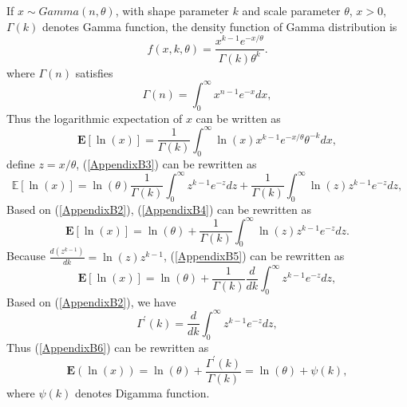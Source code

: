 \documentclass[12pt, draftclsnofoot, onecolumn]{IEEEtran}
\begin{document}
\section{}\label{proof log expectation gamma}
If $x\sim Gamma(n, \theta)$, with shape parameter $k$ and scale parameter $\theta$, $x>0$, $\Gamma(k)$ denotes Gamma function, the density function of Gamma distribution is
\begin{equation}
f(x,k,\theta)=\frac{x^{k-1}e^{-x/\theta}}{\Gamma(k)\theta^{k}}.
\label{AppendixB1}
\end{equation}
where $\Gamma(n)$ satisfies\cite{papoulis2002probability}
\begin{equation}
\Gamma(n)=\int_{0}^{\infty}x^{n-1}e^{-x}dx,
\label{AppendixB2}
\end{equation}
Thus the logarithmic expectation of $x$ can be written as
\begin{equation}
\mathbf{E}[\ln(x)]=\frac{1}{\Gamma(k)}\int_{0}^{\infty}\ln(x)x^{k-1}e^{-x/\theta}\theta^{-k}dx,
\label{AppendixB3}
\end{equation}
define $z=x/\theta$, (\ref{AppendixB3}) can be rewritten as
\begin{equation}
\mathbb{E}[\ln(x)]=\ln(\theta)\frac{1}{\Gamma(k)}\int_{0}^{\infty}z^{k-1}e^{-z}dz+\frac{1}{\Gamma(k)}\int_{0}^{\infty}\ln(z)z^{k-1}e^{-z}dz,
\label{AppendixB4}
\end{equation}
Based on (\ref{AppendixB2}), (\ref{AppendixB4}) can be rewritten as
\begin{equation}
\mathbf{E}[\ln(x)]=\ln(\theta)+\frac{1}{\Gamma(k)}\int_{0}^{\infty}\ln(z)z^{k-1}e^{-z}dz.
\label{AppendixB5}
\end{equation}
Because $\frac{d(z^{k-1})}{dk}=\ln(z)z^{k-1}$, (\ref{AppendixB5}) can be rewritten as
\begin{equation}
\mathbf{E}[\ln(x)]=\ln(\theta)+\frac{1}{\Gamma(k)}\frac{d}{dk}\int_{0}^{\infty}z^{k-1}e^{-z}dz,
\label{AppendixB6}
\end{equation}
Based on (\ref{AppendixB2}), we have
\begin{equation}
\Gamma^{'}(k)=\frac{d}{dk}\int_{0}^{\infty}z^{k-1}e^{-z}dz,
\label{AppendixB7}
\end{equation}
Thus (\ref{AppendixB6}) can be rewritten as
\begin{equation}
\mathbf{E}(\ln(x))=\ln(\theta)+\frac{\Gamma^{'}(k)}{\Gamma(k)}=\ln(\theta)+\psi(k),
\label{AppendixB8}
\end{equation}
where $\psi(k)$ denotes Digamma function.
\end{document}
